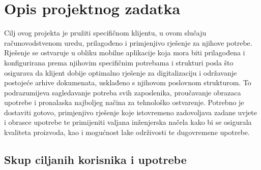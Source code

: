 \chapter{Opis projektnog zadatka}
		
		Cilj ovog projekta je pružiti specifičnom klijentu, u ovom slučaju računovodstvenom uredu, prilagođeno i primjenjivo rješenje za njihove potrebe. Rješenje se ostvaruje u obliku mobilne aplikacije koja mora biti prilagođena i konfigurirana prema njihovim specifičnim potrebama i strukturi posla što osigurava da klijent dobije optimalno rješenje za digitalizaciju i održavanje postojeće arhive dokumenata, usklađeno s njihovom poslovnom strukturom. To podrazumijeva sagledavanje potreba svih zaposlenika, proučavanje obrazaca upotrebe i pronalaska najboljeg načina za tehnološko ostvarenje. Potrebno je dostaviti gotovo, primjenjivo rješenje koje istovremeno zadovoljava zadane uvjete i obrasce upotrebe te primijeniti valjana inženjerska načela kako bi se osigurala kvaliteta proizvoda, kao i mogućnost lake održivosti te dugovremene upotrebe.
		\eject
		
		\section{Skup ciljanih korisnika i upotrebe}
		
